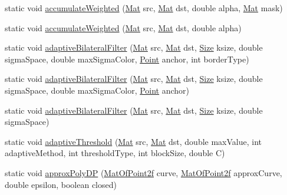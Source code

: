 \begin{DoxyCompactItemize}
\item 
static void \mbox{\hyperlink{classorg_1_1opencv_1_1imgproc_1_1_imgproc_a67077201750b8f44b2a8ce7483f58883}{accumulate\+Weighted}} (\mbox{\hyperlink{classorg_1_1opencv_1_1core_1_1_mat}{Mat}} src, \mbox{\hyperlink{classorg_1_1opencv_1_1core_1_1_mat}{Mat}} dst, double alpha, \mbox{\hyperlink{classorg_1_1opencv_1_1core_1_1_mat}{Mat}} mask)
\item 
static void \mbox{\hyperlink{classorg_1_1opencv_1_1imgproc_1_1_imgproc_ac68bfd1c13f6547a6db9d14a88c9fa53}{accumulate\+Weighted}} (\mbox{\hyperlink{classorg_1_1opencv_1_1core_1_1_mat}{Mat}} src, \mbox{\hyperlink{classorg_1_1opencv_1_1core_1_1_mat}{Mat}} dst, double alpha)
\item 
static void \mbox{\hyperlink{classorg_1_1opencv_1_1imgproc_1_1_imgproc_a1b26a0ff327de4e9e576eb2950794d19}{adaptive\+Bilateral\+Filter}} (\mbox{\hyperlink{classorg_1_1opencv_1_1core_1_1_mat}{Mat}} src, \mbox{\hyperlink{classorg_1_1opencv_1_1core_1_1_mat}{Mat}} dst, \mbox{\hyperlink{classorg_1_1opencv_1_1core_1_1_size}{Size}} ksize, double sigma\+Space, double max\+Sigma\+Color, \mbox{\hyperlink{classorg_1_1opencv_1_1core_1_1_point}{Point}} anchor, int border\+Type)
\item 
static void \mbox{\hyperlink{classorg_1_1opencv_1_1imgproc_1_1_imgproc_aa76bd5802e7865c91dcc13152fbd7f1a}{adaptive\+Bilateral\+Filter}} (\mbox{\hyperlink{classorg_1_1opencv_1_1core_1_1_mat}{Mat}} src, \mbox{\hyperlink{classorg_1_1opencv_1_1core_1_1_mat}{Mat}} dst, \mbox{\hyperlink{classorg_1_1opencv_1_1core_1_1_size}{Size}} ksize, double sigma\+Space, double max\+Sigma\+Color, \mbox{\hyperlink{classorg_1_1opencv_1_1core_1_1_point}{Point}} anchor)
\item 
static void \mbox{\hyperlink{classorg_1_1opencv_1_1imgproc_1_1_imgproc_a1ce86f78f836c6c711db8aaeae46bf09}{adaptive\+Bilateral\+Filter}} (\mbox{\hyperlink{classorg_1_1opencv_1_1core_1_1_mat}{Mat}} src, \mbox{\hyperlink{classorg_1_1opencv_1_1core_1_1_mat}{Mat}} dst, \mbox{\hyperlink{classorg_1_1opencv_1_1core_1_1_size}{Size}} ksize, double sigma\+Space)
\item 
static void \mbox{\hyperlink{classorg_1_1opencv_1_1imgproc_1_1_imgproc_a8daf182545498116be4dabcfd9a0429e}{adaptive\+Threshold}} (\mbox{\hyperlink{classorg_1_1opencv_1_1core_1_1_mat}{Mat}} src, \mbox{\hyperlink{classorg_1_1opencv_1_1core_1_1_mat}{Mat}} dst, double max\+Value, int adaptive\+Method, int threshold\+Type, int block\+Size, double C)
\item 
static void \mbox{\hyperlink{classorg_1_1opencv_1_1imgproc_1_1_imgproc_af6bf03f1dd26e4ddc0a25996533d93e3}{approx\+Poly\+DP}} (\mbox{\hyperlink{classorg_1_1opencv_1_1core_1_1_mat_of_point2f}{Mat\+Of\+Point2f}} curve, \mbox{\hyperlink{classorg_1_1opencv_1_1core_1_1_mat_of_point2f}{Mat\+Of\+Point2f}} approx\+Curve, double epsilon, boolean closed)

\end{DoxyCompactItemize}
